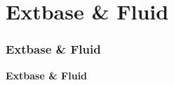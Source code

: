 %

\section{Extbase \& Fluid}
\begin{frame}[fragile]
	\frametitle{Extbase \& Fluid}

	\begin{center}\huge{\color{typo3darkgrey}\textbf{Extbase \& Fluid}}\end{center}
	\begin{center}\large{\textit{}}\end{center}

\end{frame}



